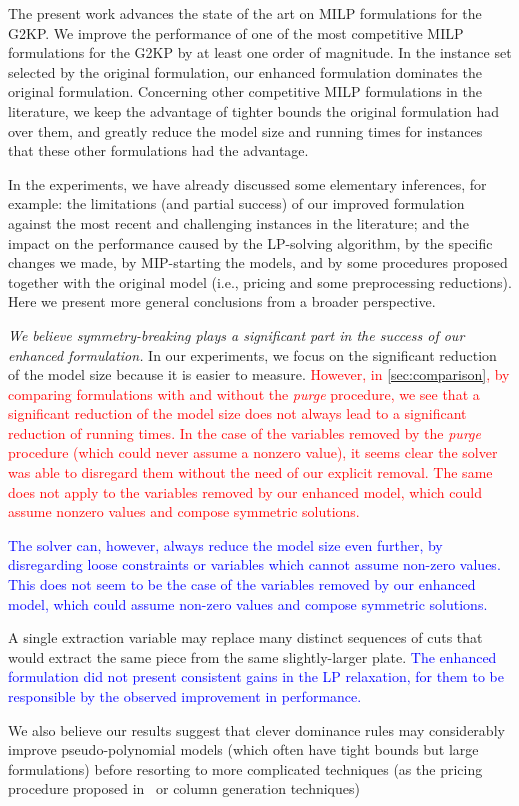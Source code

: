 \documentclass[smallextended]{svjour3}       %
\newif\iffinalversion
\newcommand{\newtext}[1]{\iffinalversion%
#1%
\else%
\textcolor{blue}{#1}%
\fi%
}
\newcommand{\oldtext}[1]{\iffinalversion%
\else%
\textcolor{red}{#1}%
\fi%
}
\begin{document}
The present work advances the state of the art on MILP formulations for the G2KP.
We improve the performance of one of the most competitive MILP formulations for the G2KP by at least one order of magnitude.
In the instance set selected by the original formulation, our enhanced formulation dominates the original formulation.
Concerning other competitive MILP formulations in the literature, we keep the advantage of tighter bounds the original formulation had over them, and greatly reduce the model size and running times for instances that these other formulations had the advantage.

In the experiments, we have already discussed some elementary inferences, for example: the limitations (and partial success) of our improved formulation against the most recent and challenging instances in the literature; and the impact on the performance caused by the LP-solving algorithm, by the specific changes we made, by MIP-starting the models, and by some procedures proposed together with the original model (i.e., pricing and some preprocessing reductions).
Here we present more general conclusions from a broader perspective.

\emph{We believe symmetry-breaking plays a significant part in the success of our enhanced formulation.}
In our experiments, we focus on the significant reduction of the model size because it is easier to measure. \oldtext{However, in \autoref{sec:comparison}, by comparing formulations with and without the \emph{purge} procedure, we see that a significant reduction of the model size does not always lead to a significant reduction of running times. In the case of the variables removed by the \emph{purge} procedure (which could never assume a nonzero value), it seems clear the solver was able to disregard them without the need of our explicit removal. The same does not apply to the variables removed by our enhanced model, which could assume nonzero values and compose symmetric solutions.}
\newtext{The solver can, however, always reduce the model size even further, by disregarding loose constraints or variables which cannot assume non-zero values. This does not seem to be the case of the variables removed by our enhanced model, which could assume non-zero values and compose symmetric solutions.}
A single extraction variable may replace many distinct sequences of cuts that would extract the same piece from the same slightly-larger plate.
\newtext{The enhanced formulation did not present consistent gains in the LP relaxation, for them to be responsible by the observed improvement in performance.}
We also believe our results suggest that clever dominance rules may considerably improve pseudo-polynomial models (which often have tight bounds but large formulations) before resorting to more complicated techniques (as the pricing procedure proposed in~\cite{furini:2016} or column generation techniques)
\end{document}
